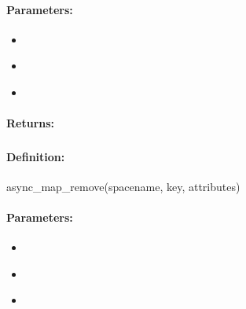 \paragraph{Parameters:}
\begin{itemize}[noitemsep]
\item {}\\

\item {}\\

\item {}\\

\end{itemize}

\paragraph{Returns:}


\pagebreak
\subsubsection{}
\label{api:ruby:async_map_remove}


\paragraph{Definition:}
\begin{rubycode}
async_map_remove(spacename, key, attributes)
\end{rubycode}

\paragraph{Parameters:}
\begin{itemize}[noitemsep]
\item {}\\

\item {}\\

\item {}\\

\end{itemize}

